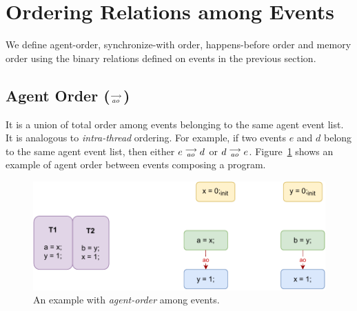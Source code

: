 \section{Ordering Relations among Events}
        
    We define agent-order, synchronize-with order, happens-before order and memory order using the binary relations defined on events in the previous section.

    \subsection{Agent Order ($\stackrel{\longrightarrow}{_{ao}}$)}
        It is a union of total order among events belonging to the same agent event list. 
        It is analogous to \textit{intra-thread} ordering. 
        For example, if two events $e$ and $d$ belong to the same agent event list, then either $e\stackrel{\longrightarrow}{_{ao}}d$ or $d\stackrel{\longrightarrow}{_{ao}}e$. 
        Figure~\ref{model:agent-order} shows an example of agent order between events composing a program.
        \begin{figure}[H]
            \centering
            \includegraphics[scale=0.7]{4.ECMAScriptMemoryModel/AgentOrder.pdf}
            \caption{An example with \textit{agent-order} among events.}
            \label{model:agent-order}
        \end{figure}
    
